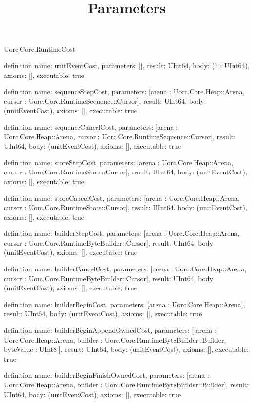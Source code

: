 \begin{lexlean}{Uorc.Core.RuntimeCost}
\title{Parameters}
\begin{semanticmodule}
definition{
  name: unitEventCost,
  parameters: [],
  result: UInt64,
  body: (1 : UInt64),
  axioms: [],
  executable: true
}

definition{
  name: sequenceStepCost,
  parameters: [arena : Uorc.Core.Heap::Arena, cursor : Uorc.Core.RuntimeSequence::Cursor],
  result: UInt64,
  body: (unitEventCost),
  axioms: [],
  executable: true
}

definition{
  name: sequenceCancelCost,
  parameters: [arena : Uorc.Core.Heap::Arena, cursor : Uorc.Core.RuntimeSequence::Cursor],
  result: UInt64,
  body: (unitEventCost),
  axioms: [],
  executable: true
}

definition{
  name: storeStepCost,
  parameters: [arena : Uorc.Core.Heap::Arena, cursor : Uorc.Core.RuntimeStore::Cursor],
  result: UInt64,
  body: (unitEventCost),
  axioms: [],
  executable: true
}

definition{
  name: storeCancelCost,
  parameters: [arena : Uorc.Core.Heap::Arena, cursor : Uorc.Core.RuntimeStore::Cursor],
  result: UInt64,
  body: (unitEventCost),
  axioms: [],
  executable: true
}

definition{
  name: builderStepCost,
  parameters: [arena : Uorc.Core.Heap::Arena, cursor : Uorc.Core.RuntimeByteBuilder::Cursor],
  result: UInt64,
  body: (unitEventCost),
  axioms: [],
  executable: true
}

definition{
  name: builderCancelCost,
  parameters: [arena : Uorc.Core.Heap::Arena, cursor : Uorc.Core.RuntimeByteBuilder::Cursor],
  result: UInt64,
  body: (unitEventCost),
  axioms: [],
  executable: true
}

definition{
  name: builderBeginCost,
  parameters: [arena : Uorc.Core.Heap::Arena],
  result: UInt64,
  body: (unitEventCost),
  axioms: [],
  executable: true
}

definition{
  name: builderBeginAppendOwnedCost,
  parameters: [
    arena : Uorc.Core.Heap::Arena,
    builder : Uorc.Core.RuntimeByteBuilder::Builder,
    byteValue : UInt8
  ],
  result: UInt64,
  body: (unitEventCost),
  axioms: [],
  executable: true
}

definition{
  name: builderBeginFinishOwnedCost,
  parameters: [arena : Uorc.Core.Heap::Arena, builder : Uorc.Core.RuntimeByteBuilder::Builder],
  result: UInt64,
  body: (unitEventCost),
  axioms: [],
  executable: true
}


\end{semanticmodule}
\end{lexlean}
